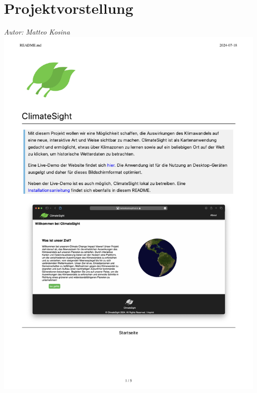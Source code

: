 \documentclass[12pt]{article}
\begin{document}
\section{Projektvorstellung}
{\it Autor: Matteo Kosina}
\newline
\includegraphics[width=\textwidth, page=1]{Planungsdokumente/graphics/README.pdf}
\end{document}
